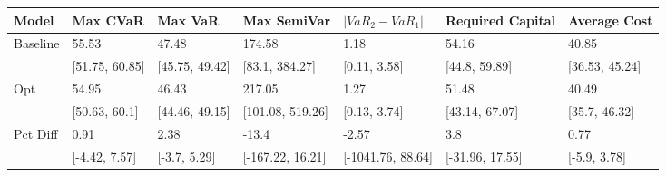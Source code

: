 \begin{tabular}{lllllll}
\toprule
   Model &       Max CVaR &        Max VaR &      Max SemiVar & $|VaR_2 - VaR_1|$ & Required Capital &   Average Cost \\
\midrule
Baseline &          55.53 &          47.48 &           174.58 &              1.18 &            54.16 &          40.85 \\
         & [51.75, 60.85] & [45.75, 49.42] &   [83.1, 384.27] &      [0.11, 3.58] &    [44.8, 59.89] & [36.53, 45.24] \\
     Opt &          54.95 &          46.43 &           217.05 &              1.27 &            51.48 &          40.49 \\
         &  [50.63, 60.1] & [44.46, 49.15] & [101.08, 519.26] &      [0.13, 3.74] &   [43.14, 67.07] &  [35.7, 46.32] \\
Pct Diff &           0.91 &           2.38 &            -13.4 &             -2.57 &              3.8 &           0.77 \\
         &  [-4.42, 7.57] &   [-3.7, 5.29] & [-167.22, 16.21] & [-1041.76, 88.64] &  [-31.96, 17.55] &   [-5.9, 3.78] \\
\bottomrule
\end{tabular}
